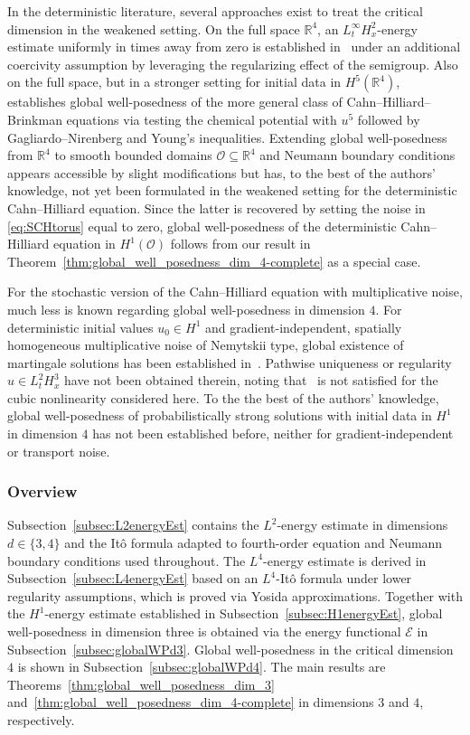 \documentclass[reqno]{amsart}
\newcommand{\R}{\mathbb{R}}
\newcommand{\sO}{\mathscr{O}}
\newcommand{\seq}{\subseteq}
\newcommand{\1}{\mathbf{1}}
\begin{document}
In the deterministic literature, several approaches exist to treat the critical dimension in the weakened setting. On the full space $\R^4$, an $L_t^\infty H_x^2$-energy estimate uniformly in times away from zero is established in~\cite[Thm.~3.1]{CholewaRodriguezB14} under an additional coercivity assumption by leveraging the regularizing effect of the semigroup. Also on the full space, but in a stronger setting for initial data in $H^5(\R^4)$,~\cite{Cahn-Hilliard-Brinkman-global-d4} establishes global well-posedness of the more general class of Cahn--Hilliard--Brinkman equations via testing the chemical potential with $u^5$ followed by Gagliardo--Nirenberg and Young's inequalities. Extending global well-posedness from $\R^4$ to smooth bounded domains $\sO\seq \R^4$ and Neumann boundary conditions appears accessible by slight modifications but has, to the best of the authors' knowledge, not yet been formulated in the weakened setting for the deterministic Cahn--Hilliard equation. Since the latter is recovered by setting the noise in \eqref{eq:SCHtorus} equal to zero, global well-posedness of the deterministic Cahn--Hilliard equation in $H^1(\sO)$ follows from our result in Theorem~\ref{thm:global_well_posedness_dim_4-complete} as a special case.

For the stochastic version of the Cahn--Hilliard equation with multiplicative noise, much less is known regarding global well-posedness in dimension $4$. 
For deterministic initial values $u_0\in H^1$ and gradient-independent, spatially homogeneous multiplicative noise of Nemytskii type, global existence of martingale solutions has been established in~\cite[Thm.~2.2]{Scarpa2021b}. Pathwise uniqueness or regularity $u\in L_t^2H_x^3$ have not been obtained therein, noting that~\cite[(2.4)]{Scarpa2021b} is not satisfied for the cubic nonlinearity considered here. To the the best of the authors' knowledge, global well-posedness of probabilistically strong solutions with initial data in $H^1$ in dimension $4$ has not been established before, neither for gradient-independent or transport noise.


\subsubsection*{Overview}  Subsection~\ref{subsec:L2energyEst} contains the $L^2$-energy estimate in dimensions $d\in \{3,4\}$ and the Itô formula adapted to fourth-order equation and Neumann boundary conditions used throughout. The $L^4$-energy estimate is derived in Subsection~\ref{subsec:L4energyEst} based on an $L^4$-Itô formula under lower regularity assumptions, which is proved via Yosida approximations. Together with the $H^1$-energy estimate established in Subsection~\ref{subsec:H1energyEst}, global well-posedness in dimension three is obtained via the energy functional $\mathcal{E}$ in Subsection~\ref{subsec:globalWPd3}. Global well-posedness in the critical dimension $4$ is shown in Subsection~\ref{subsec:globalWPd4}. The main results are Theorems~\ref{thm:global_well_posedness_dim_3} and~\ref{thm:global_well_posedness_dim_4-complete} in dimensions $3$ and $4$, respectively.
\end{document}

